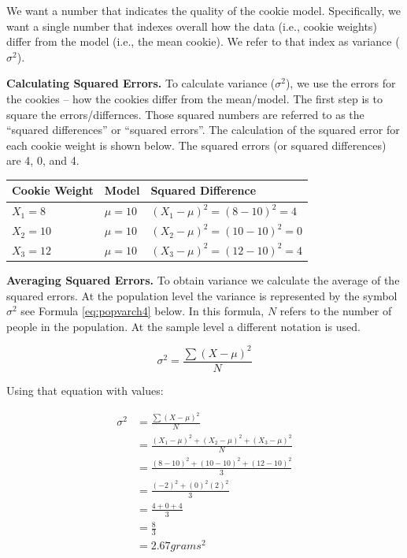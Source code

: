 \documentclass[
]{krantz}
\begin{document}
We want a number that indicates the quality of the cookie model. Specifically, we want a single number that indexes overall how the data (i.e., cookie weights) differ from the model (i.e., the mean cookie). We refer to that index as variance (\(\sigma^2\)).

\textbf{Calculating Squared Errors.} To calculate variance (\(\sigma^2\)), we use the errors for the cookies -- how the cookies differ from the mean/model. The first step is to square the errors/differnces. Those squared numbers are referred to as the ``squared differences'' or ``squared errors''. The calculation of the squared error for each cookie weight is shown below. The squared errors (or squared differences) are 4, 0, and 4.

\begin{longtable}[]{@{}lll@{}}
\toprule
Cookie Weight & Model & Squared Difference\tabularnewline
\midrule
\endhead
\(X_1 = 8\) & \(\mu = 10\) & \((X_1 - \mu)^2 =(8 - 10)^2= 4\)\tabularnewline
\(X_2 = 10\) & \(\mu = 10\) & \((X_2 - \mu)^2 =(10 - 10)^2= 0\)\tabularnewline
\(X_3 = 12\) & \(\mu = 10\) & \((X_3 - \mu)^2 =(12 - 10)^2= 4\)\tabularnewline
\bottomrule
\end{longtable}

\textbf{Averaging Squared Errors.} To obtain variance we calculate the average of the squared errors. At the population level the variance is represented by the symbol \(\sigma^2\) see Formula \eqref{eq:popvarch4} below. In this formula, \(N\) refers to the number of people in the population. At the sample level a different notation is used.

\begin{equation} 
\sigma^2 = \frac{\sum{(X - \mu)^2}}{N}
      \label{eq:popvarch4}
\end{equation}

Using that equation with values:

\[
\begin{aligned} 
\sigma^2 &= \frac{\sum{(X - \mu)^2}}{N}\\
&= \frac{(X_1-\mu)^2 + (X_2-\mu)^2 + (X_3-\mu)^2}{N}  \\ 
&= \frac{(8-10)^2 + (10-10)^2 + (12-10)^2}{3}\\
&= \frac{(-2)^2 + (0)^2 (2)^2}{3} \\
&= \frac{4 + 0 + 4}{3} \\
&= \frac{8}{3} \\
&= 2.67 grams^2 \\
\end{aligned} 
\]
\end{document}
